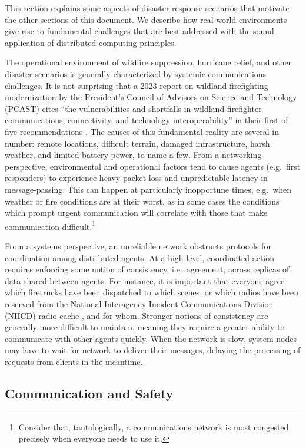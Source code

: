 \documentclass[]             %
{NASA}                       %
\theoremstyle{definition}
\begin{document}
\label{sec:disaster-response}

This section explains some aspects of disaster response scenarios that
motivate the other sections of this document. We describe how real-world
environments give rise to fundamental challenges that are best addressed
with the sound application of distributed computing principles.

The operational environment of wildfire suppression, hurricane relief,
and other disaster scenarios is generally characterized by systemic
communications challenges. It is not surprising that a 2023 report on
wildland firefighting modernization by the President’s Council of
Advisors on Science and Technology (PCAST) cites ``the
vulnerabilities and shortfalls in wildland firefighter communications,
connectivity, and technology interoperability'' in their first of five
recommendations \cite{pcast2023}. The causes of this fundamental
reality are several in number: remote locations, difficult terrain,
damaged infrastructure, harsh weather, and limited battery power, to
name a few.  From a networking perspective, environmental and
operational factors tend to cause agents (e.g.~first responders) to
experience heavy packet loss and unpredictable latency in
message-passing. This can happen at particularly inopportune times,
e.g.~when weather or fire conditions are at their worst, as in some
cases the conditions which prompt urgent communication will correlate
with those that make communication difficult.\footnote{Consider that,
tautologically, a communications network is most \mbox{congested}
precisely when everyone needs to use it.}

From a systems perspective, an unreliable network obstructs protocols
for coordination among distributed agents. At a high level,
coordinated action requires enforcing some notion of consistency,
i.e.~agreement, across replicas of data shared between agents. For
instance, it is important that everyone agree which firetrucks have
been dispatched to which scenes, or which radios have been reserved
from the National Interagency Incident Communications Division (NIICD)
radio cache \cite{radiocache}, and for whom. Stronger notions of
consistency are generally more difficult to maintain, meaning they
require a greater ability to communicate with other agents
quickly. When the network is slow, system nodes may have to wait for
network to deliver their messages, delaying the processing of requests
from clients in the meantime.

\hypertarget{communication-and-safety}{%
\subsection{Communication and Safety}\label{communication-and-safety}}
\end{document}
